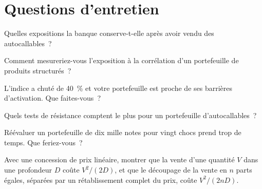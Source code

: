 \section{Questions d'entretien}

\begin{interviewq}\label{iq:s2:hedging-a-structured-products-book:1}
Quelles expositions la banque conserve-t-elle après avoir vendu des autocallables~?
\end{interviewq}

\begin{interviewq}\label{iq:s2:hedging-a-structured-products-book:2}
Comment mesureriez-vous l'exposition à la corrélation d'un portefeuille de produits structurés~?
\end{interviewq}

\begin{interviewq}\label{iq:s2:hedging-a-structured-products-book:3}
L'indice a chuté de 40~\% et votre portefeuille est proche de ses barrières d'activation. Que faites-vous~?
\end{interviewq}

\begin{interviewq}\label{iq:s2:hedging-a-structured-products-book:4}
Quels tests de résistance comptent le plus pour un portefeuille d'autocallables~?
\end{interviewq}

\begin{interviewq}\label{iq:s2:hedging-a-structured-products-book:5}
Réévaluer un portefeuille de dix mille notes pour vingt chocs prend trop de temps. Que feriez-vous~?
\end{interviewq}

\begin{interviewq}\label{iq:s2:hedging-a-structured-products-book:6}
Avec une concession de prix linéaire, montrer que la vente d'une quantité $V$ dans une profondeur $D$ coûte $V^2/(2D)$, et que le découpage de la vente en $n$ parts égales,
séparées par un rétablissement complet du prix, coûte $V^2/(2nD)$.
\end{interviewq}
